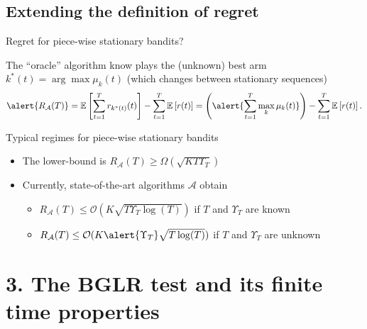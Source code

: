 \documentclass[11pt,english,ignorenonframetext,]{beamer}
\providecommand{\tightlist}{%
  \setlength{\itemsep}{0pt}\setlength{\parskip}{0pt}}
\begin{document}
\subsection{\hfill{}Extending the definition of regret\hfill{}}

\begin{frame}{Regret for piece-wise stationary bandits?}

  The ``oracle'' algorithm know plays the (unknown) best arm $k^*(t) = \arg\max \mu_k(t)$
  (which changes between stationary sequences)
  \[ \alert{ R_{\mathcal{A}}(T) } = \mathbb{E}\left[ \sum\limits_{t=1}^T r_{k^*(t)}(t) \right] - \sum\limits_{t=1}^T \mathbb{E}\left[ r(t) \right] = \left(\alert{\sum_{t=1}^T \max_k \mu_k(t)} \right) - \sum\limits_{t=1}^T \mathbb{E}\left[ r(t) \right]. \]

\pause
\vspace*{10pt}

\begin{exampleblock}{Typical regimes for piece-wise stationary bandits}
  \begin{itemize}
  \item
  The lower-bound is
  $R_{\mathcal{A}}(T) \geq \Omega(\sqrt{K T \Upsilon_T})$

  \item
  Currently, state-of-the-art algorithms $\mathcal{A}$ obtain
    \begin{itemize}\tightlist
      \item
      $R_{\mathcal{A}}(T) \leq \mathcal{O}(K \sqrt{T \Upsilon_T \log(T)})$
      if $T$ and $\Upsilon_T$ are known
      \item
      $R_{\mathcal{A}}(T) \leq \mathcal{O}(K \alert{\Upsilon_T} \sqrt{T \log(T)})$
      if $T$ and \alert{$\Upsilon_T$ are unknown}
    \end{itemize}
  \end{itemize}
\end{exampleblock}

\end{frame}


\section{\hfill{}3. The BGLR test and its finite time properties\hfill{}}
\end{document}
